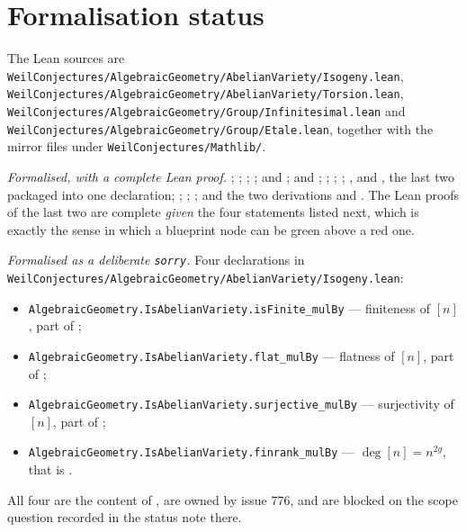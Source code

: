\section{Formalisation status}\label{sec:av-status}

The Lean sources are
\texttt{WeilConjectures/AlgebraicGeometry/AbelianVariety/Isogeny.lean},
\texttt{WeilConjectures/AlgebraicGeometry/AbelianVariety/Torsion.lean},
\texttt{WeilConjectures/AlgebraicGeometry/Group/Infinitesimal.lean} and
\texttt{WeilConjectures/AlgebraicGeometry/Group/Etale.lean}, together with the
mirror files under \texttt{WeilConjectures/Mathlib/}.

\emph{Formalised, with a complete Lean proof.}
; ; ;
;  and
;  and
; ;
; ;
,
 and , the last two
packaged into one declaration; ;
;
; and the two derivations
 and .  The Lean proofs
of the last two are complete \emph{given} the four statements listed next,
which is exactly the sense in which a blueprint node can be green above a red
one.

\emph{Formalised as a deliberate \texttt{sorry}.}  Four declarations in
\texttt{WeilConjectures/AlgebraicGeometry/AbelianVariety/Isogeny.lean}:
\begin{itemize}
  \item \texttt{AlgebraicGeometry.IsAbelianVariety.isFinite\_mulBy} ---
    finiteness of $[n]$, part of ;
  \item \texttt{AlgebraicGeometry.IsAbelianVariety.flat\_mulBy} --- flatness of
    $[n]$, part of ;
  \item \texttt{AlgebraicGeometry.IsAbelianVariety.surjective\_mulBy} ---
    surjectivity of $[n]$, part of ;
  \item \texttt{AlgebraicGeometry.IsAbelianVariety.finrank\_mulBy} ---
    $\deg[n]=n^{2g}$, that is .
\end{itemize}
All four are the content of , are owned by issue 776, and
are blocked on the scope question recorded in the status note there.

